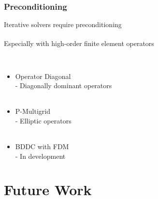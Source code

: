 \documentclass{beamer}
\begin{document}
\begin{frame}
\begin{center}
\frametitle{Preconditioning}

{\flushleft
Iterative solvers require preconditioning\\

~\\

Especially with high-order finite element operators\\
}

~\\

\begin{itemize}

\item Operator Diagonal\\
- Diagonally dominant operators\\

~\\

\item P-Multigrid\\
- Elliptic operators\\

~\\

\item BDDC with FDM\\
- In development

\end{itemize}

\end{center}
\end{frame}

\section{Future Work}
\end{document}

